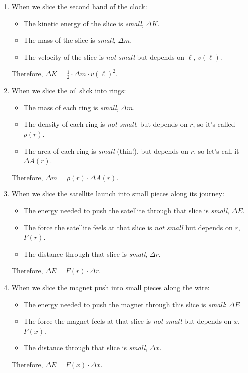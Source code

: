 \documentclass[12pt]{article}
\begin{document}
\begin{enumerate}
\item When we slice the second hand of the clock:
\begin{itemize}
\item The kinetic energy of the slice is \textit{small}, \(\Delta K\).
\item The mass of the slice is \textit{small}, \(\Delta m\).
\item The velocity of the slice is \textit{not small} but depends on \(\ell\), \(v(\ell)\).
\end{itemize}
Therefore, \(\Delta K = \frac12\cdot\Delta m\cdot v(\ell)^2\).

\item When we slice the oil slick into rings:
\begin{itemize}
    \item The mass of each ring is \textit{small}, \(\Delta m\).
    \item The density of each ring is \textit{not small}, but depends on \(r\), so it's called \(\rho(r)\).
    \item The area of each ring is \textit{small} (thin!), but depends on \(r\), so let's call it \(\Delta A(r)\).
\end{itemize}
Therefore, \(\Delta m = \rho(r) \cdot \Delta A(r)\).

\item When we slice the satellite launch into small pieces along its journey: 
\begin{itemize}
    \item The energy needed to push the satellite through that slice is \textit{small}, \(\Delta E\).
    \item The force the satellite feels at that slice is \textit{not small} but depends on \(r\), \(F(r)\).
    \item The distance through that slice is \textit{small}, \(\Delta r\).
\end{itemize}
Therefore, \(\Delta E = F(r) \cdot \Delta r\).

\item When we slice the magnet push into small pieces along the wire:
\begin{itemize}
    \item The energy needed to push the magnet through this slice is \textit{small}: \(\Delta E\)
    \item The force the magnet feels at that slice is \textit{not small} but depends on \(x\), \(F(x)\).
    \item The distance through that slice is \textit{small}, \(\Delta x\).
\end{itemize}
Therefore, \(\Delta E = F(x) \cdot \Delta x\).


\end{enumerate}
\end{document}
